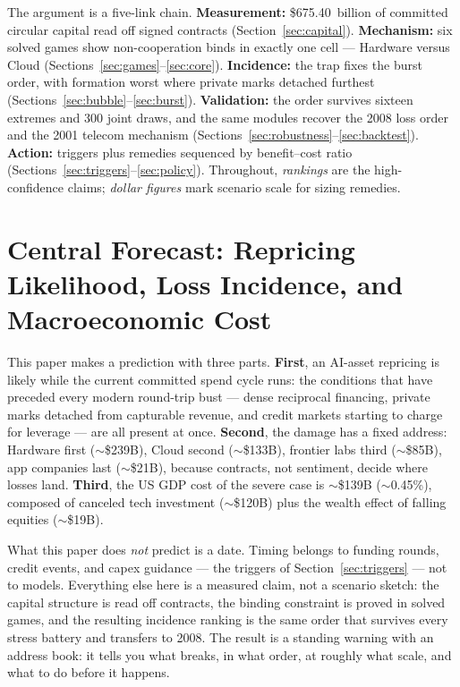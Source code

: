 \documentclass[11pt,a4paper]{article}
\begin{document}
The argument is a five-link chain. \textbf{Measurement:} \$675.40~billion
of committed circular capital read off signed contracts
(Section~\ref{sec:capital}). \textbf{Mechanism:} six solved games show
non-cooperation binds in exactly one cell --- Hardware versus Cloud
(Sections~\ref{sec:games}--\ref{sec:core}). \textbf{Incidence:} the trap
fixes the burst order, with formation worst where private marks detached
furthest (Sections~\ref{sec:bubble}--\ref{sec:burst}). \textbf{Validation:}
the order survives sixteen extremes and 300 joint draws, and the same
modules recover the 2008 loss order and the 2001 telecom mechanism
(Sections~\ref{sec:robustness}--\ref{sec:backtest}). \textbf{Action:}
triggers plus remedies sequenced by benefit--cost ratio
(Sections~\ref{sec:triggers}--\ref{sec:policy}). Throughout,
\emph{rankings} are the high-confidence claims; \emph{dollar figures} mark
scenario scale for sizing remedies.

\section{Central Forecast: Repricing Likelihood, Loss Incidence, and Macroeconomic Cost}\label{sec:prediction}
This paper makes a prediction with three parts. \textbf{First}, an AI-asset
repricing is likely while the current committed spend cycle runs: the
conditions that have preceded every modern round-trip bust --- dense
reciprocal financing, private marks detached from capturable revenue, and
credit markets starting to charge for leverage --- are all present at once.
\textbf{Second}, the damage has a fixed address: Hardware first
($\sim$\$239B), Cloud second ($\sim$\$133B), frontier labs third
($\sim$\$85B), app companies last ($\sim$\$21B), because contracts, not
sentiment, decide where losses land. \textbf{Third}, the US GDP cost of the
severe case is $\sim$\$139B ($\sim$0.45\%), composed of canceled tech
investment ($\sim$\$120B) plus the wealth effect of falling equities
($\sim$\$19B).

What this paper does \emph{not} predict is a date. Timing belongs to funding
rounds, credit events, and capex guidance --- the triggers of Section~\ref{sec:triggers} ---
not to models. Everything else here is a measured claim, not a scenario
sketch: the capital structure is read off contracts, the binding constraint
is proved in solved games, and the resulting incidence ranking is the same
order that survives every stress battery and transfers to 2008. The result
is a standing warning with an address book: it tells you what breaks, in
what order, at roughly what scale, and what to do before it happens.
\end{document}
